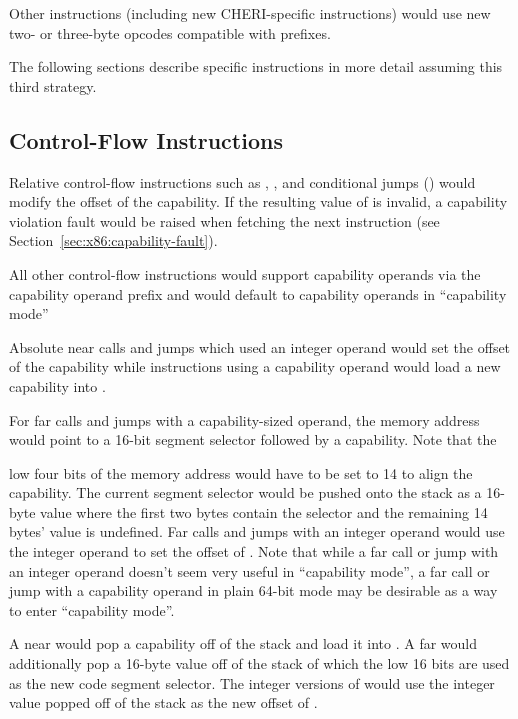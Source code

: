Other instructions (including new CHERI-specific instructions) would
use new two- or three-byte opcodes compatible with \VEX{} prefixes.

The following sections describe specific instructions in more detail
assuming this third strategy.

\subsection{Control-Flow Instructions}

Relative control-flow instructions such as ,
, and conditional jumps () would modify
the offset of the \CIP{} capability.  If the resulting value of \CIP{}
is invalid, a capability violation fault would be raised when fetching
the next instruction (see Section~\ref{sec:x86:capability-fault}).

All other control-flow instructions would support capability operands
via the capability operand prefix and would default to capability
operands in ``capability mode''

Absolute near calls and jumps which used an integer operand
would set the offset of the \CIP{} capability while instructions
using a capability operand would load a new capability into \CIP{}.

For far calls and jumps with a capability-sized operand,
the memory address would point
to a 16-bit segment selector followed by a capability.  Note that the

low four bits of the memory address would have to be set to 14 to
align the capability.  The current segment selector would be pushed
onto the stack as a 16-byte value where the first two bytes contain
the selector and the remaining 14 bytes' value is undefined.  Far
calls and jumps with an integer operand would use the integer operand
to set the offset of \CIP{}.  Note that while a far call or jump with
an integer operand doesn't seem very useful in ``capability mode'', a
far call or jump with a capability operand in plain 64-bit mode may be
desirable as a way to enter ``capability mode''.

A near  would pop a capability off of the stack and
load it into \CIP{}.  A far  would additionally pop
a 16-byte value off of the stack of which the low 16 bits are used
as the new code segment selector.  The integer versions of
 would use the integer value popped off of the stack
as the new offset of \CIP{}.

